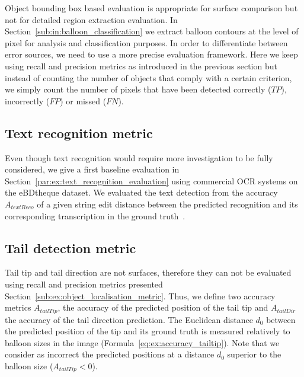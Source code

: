 Object bounding box based evaluation is appropriate for surface comparison but not for detailed region extraction evaluation.
In Section~\ref{sub:in:balloon_classification} we extract balloon contours at the level of pixel for analysis and classification purposes.
In order to differentiate between error sources, we need to use a more precise evaluation framework.
Here we keep using recall and precision metrics as introduced in the previous section but instead of counting the number of objects that comply with a certain criterion, we simply count the number of pixels that have been detected correctly ($TP$), incorrectly ($FP$) or missed ($FN$).


\subsection{Text recognition metric} %
\label{sub:ex:text_recognition_metric}
Even though text recognition would require more investigation to be fully considered, we give a first baseline evaluation in Section~\ref{par:ex:text_recognition_evaluation} using commercial OCR systems on the eBDtheque dataset.
We evaluated the text detection from the accuracy $A_{textReco}$ of a given string edit distance between the predicted recognition and its corresponding transcription in the ground truth~\cite{Guerin2013}.


\subsection{Tail detection metric} %
\label{sub:ex:tail_detection_metric}

Tail tip and tail direction are not surfaces, therefore they can not be evaluated using recall and precision metrics presented Section~\ref{sub:ex:object_localisation_metric}.
Thus, we define two accuracy metrics $A_{tailTip}$, the accuracy of the predicted position of the tail tip and $A_{tailDir}$ the accuracy of the tail direction prediction.
The Euclidean distance $d_0$ between the predicted position of the tip and its ground truth is measured relatively to balloon sizes in the image (Formula~\ref{eq:ex:accuracy_tailtip}).
Note that we consider as incorrect the predicted positions at a distance $d_0$ superior to the balloon size ($A_{tailTip} < 0$). 

